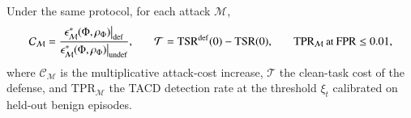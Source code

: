 Under the same protocol, for each attack $\mathcal{M}$,
\vspace{-1ex}\begin{equation}
  \small
\mathcal{C}_{\mathcal{M}}=\frac{\epsilon^{*}_{\mathcal{M}}(\Phi,\rho_{\Phi})\big|_{\mathrm{def}}}
{\epsilon^{*}_{\mathcal{M}}(\Phi,\rho_{\Phi})\big|_{\mathrm{undef}}},
\qquad
\mathcal{T}=\mathrm{TSR}^{\mathrm{def}}(0)-\mathrm{TSR}(0),
\qquad
\mathrm{TPR}_{\mathcal{M}}\ \text{at}\ \mathrm{FPR}\le0.01,
\label{eq:defense-metrics}
\vspace{-1.5ex}\end{equation}
where $\mathcal{C}_{\mathcal{M}}$ is the multiplicative attack-cost increase, $\mathcal{T}$ the clean-task
cost of the defense, and $\mathrm{TPR}_{\mathcal{M}}$ the TACD detection rate at the threshold
$\xi_{t}$ calibrated on held-out benign episodes. 


